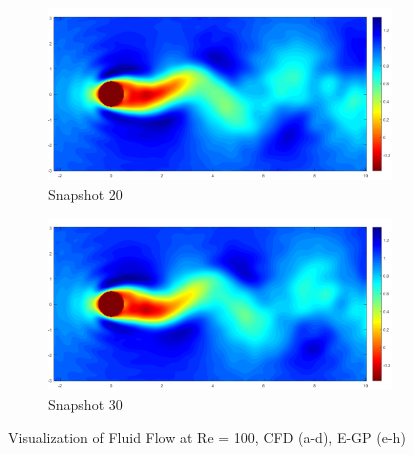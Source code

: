 \documentclass[letterpaper,12pt,peerreviewca,draftcls]{IEEEtran}
\begin{document}
\begin{figure}[h]
	\begin{subfigure}[t]{0.23\textwidth}
		\includegraphics[width=\linewidth]{"Figure S6g"}
		\caption{Snapshot 20}
	\end{subfigure}
	\begin{subfigure}[t]{0.23\textwidth}
		\includegraphics[width=\linewidth]{"Figure S6h"}
		\caption{Snapshot 30}
	\end{subfigure}
	\caption{Visualization of Fluid Flow at Re = 100, CFD (a-d), E-GP (e-h)}
	\label{fig:cfd_100}
\end{figure}
\end{document}
